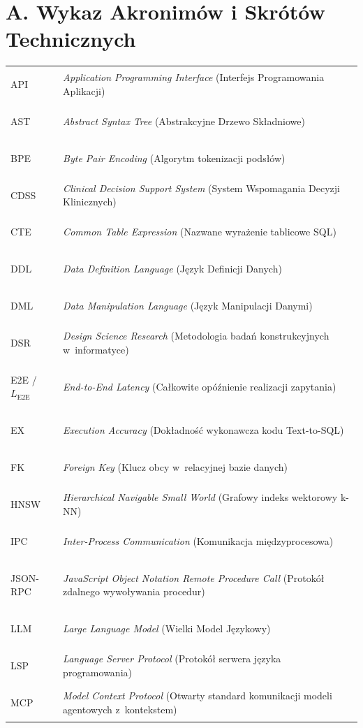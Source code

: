 
\section*{A. Wykaz Akronimów i Skrótów Technicznych}

\begin{longtable}[l]{>{\bfseries\raggedright\arraybackslash}p{2.8cm} >{\raggedright\arraybackslash}p{12.0cm}}
API & \emph{Application Programming Interface} (Interfejs Programowania Aplikacji) \\[1.5pt]
AST & \emph{Abstract Syntax Tree} (Abstrakcyjne Drzewo Składniowe) \\[1.5pt]
BPE & \emph{Byte Pair Encoding} (Algorytm tokenizacji podsłów) \\[1.5pt]
CDSS & \emph{Clinical Decision Support System} (System Wspomagania Decyzji Klinicznych) \\[1.5pt]
CTE & \emph{Common Table Expression} (Nazwane wyrażenie tablicowe SQL) \\[1.5pt]
DDL & \emph{Data Definition Language} (Język Definicji Danych) \\[1.5pt]
DML & \emph{Data Manipulation Language} (Język Manipulacji Danymi) \\[1.5pt]
DSR & \emph{Design Science Research} (Metodologia badań konstrukcyjnych w~informatyce) \\[1.5pt]
E2E / $L_{\text{E2E}}$ & \emph{End-to-End Latency} (Całkowite opóźnienie realizacji zapytania) \\[1.5pt]
EX & \emph{Execution Accuracy} (Dokładność wykonawcza kodu Text-to-SQL) \\[1.5pt]
FK & \emph{Foreign Key} (Klucz obcy w~relacyjnej bazie danych) \\[1.5pt]
HNSW & \emph{Hierarchical Navigable Small World} (Grafowy indeks wektorowy k-NN) \\[1.5pt]
IPC & \emph{Inter-Process Communication} (Komunikacja międzyprocesowa) \\[1.5pt]
JSON-RPC & \emph{JavaScript Object Notation Remote Procedure Call} (Protokół zdalnego wywoływania procedur) \\[1.5pt]
LLM & \emph{Large Language Model} (Wielki Model Językowy) \\[1.5pt]
LSP & \emph{Language Server Protocol} (Protokół serwera języka programowania) \\[1.5pt]
MCP & \emph{Model Context Protocol} (Otwarty standard komunikacji modeli agentowych z~kontekstem) \\[1.5pt]

\end{longtable}

